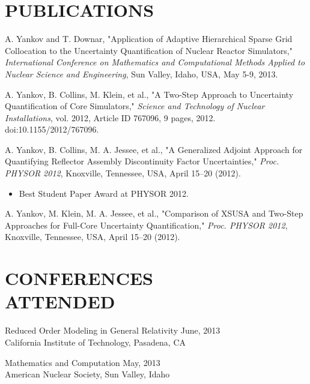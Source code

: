 \documentclass[margin, 10pt]{res} %
\begin{document}
\begin{resume}

\section{PUBLICATIONS}

A. Yankov and T. Downar, "Application of Adaptive Hierarchical Sparse Grid Collocation to the Uncertainty Quantification of Nuclear Reactor Simulators," \textit{International Conference on Mathematics and Computational Methods Applied to Nuclear Science and Engineering}, Sun Valley, Idaho, USA, May 5-9, 2013.

A. Yankov, B. Collins, M. Klein, et al., "A Two-Step Approach to Uncertainty Quantification of Core Simulators," \textit{Science and Technology of Nuclear Installations}, vol. 2012, Article ID 767096, 9 pages, 2012. doi:10.1155/2012/767096.

A. Yankov, B. Collins, M. A. Jessee, et al., "A Generalized Adjoint Approach for Quantifying Reflector Assembly Discontinuity Factor Uncertainties," \textit{Proc. PHYSOR 2012}, Knoxville, Tennessee, USA, April 15–20 (2012). %
\begin{itemize} 
\item Best Student Paper Award at PHYSOR 2012.
\end{itemize}

A. Yankov, M. Klein, M. A. Jessee, et al., "Comparison of XSUSA and Two-Step Approaches for Full-Core Uncertainty Quantification," \textit{Proc. PHYSOR 2012}, Knoxville, Tennessee, USA, April 15–20 (2012).


\section{CONFERENCES \\ ATTENDED}

Reduced Order Modeling in General Relativity \hfill June, 2013 \\
California Institute of Technology, Pasadena, CA

Mathematics and Computation \hfill May, 2013 \\
American Nuclear Society, Sun Valley, Idaho


\end{resume}
\end{document}
